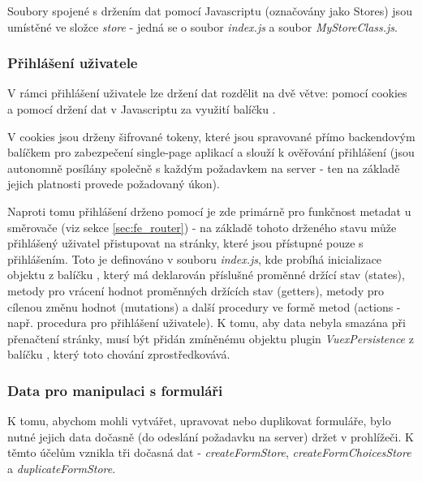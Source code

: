 	Soubory spojené s držením dat pomocí Javascriptu (označovány jako Stores) jsou umístěné ve složce \textit{store} - jedná se o soubor \textit{index.js} a soubor \textit{MyStoreClass.js}.
	
		\subsubsection{Přihlášení uživatele}
		V rámci přihlášení uživatele lze držení dat rozdělit na dvě větve: pomocí cookies a pomocí držení dat v Javascriptu za využití balíčku . 
		
		V cookies jsou drženy šifrované tokeny, které jsou spravované přímo backendovým balíčkem pro zabezpečení single-page aplikací  a slouží k ověřování přihlášení (jsou autonomně posílány společně s každým požadavkem na server - ten na základě jejich platnosti provede požadovaný úkon). 
		
		Naproti tomu přihlášení drženo pomocí  je zde primárně pro funkčnost metadat u směrovače (viz sekce \ref{sec:fe_router}) - na základě tohoto drženého stavu může přihlášený uživatel přistupovat na stránky, které jsou přístupné pouze s přihlášením. Toto je definováno v souboru \textit{index.js}, kde probíhá inicializace objektu z balíčku , který má deklarován příslušné proměnné držící stav (states), metody pro vrácení hodnot proměnných držících stav (getters), metody pro cílenou změnu hodnot (mutations) a další procedury ve formě metod (actions - např. procedura pro přihlášení uživatele). K tomu, aby data nebyla smazána při přenačtení stránky, musí být přidán zmíněnému objektu plugin \textit{VuexPersistence} z balíčku , který toto chování zprostředkovává.
		
		\subsubsection{Data pro manipulaci s formuláři}\label{sec:data_prohlizec_form}
		K tomu, abychom mohli vytvářet, upravovat nebo duplikovat formuláře, bylo nutné jejich data dočasně (do odeslání požadavku na server) držet v prohlížeči. K těmto účelům vznikla tři dočasná  dat - \textit{createFormStore}, \textit{createFormChoicesStore} a \textit{duplicateFormStore}.
		
